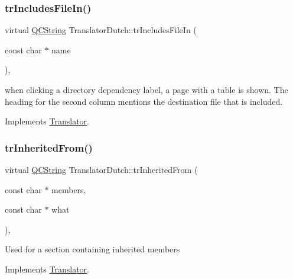 \mbox{\label{class_translator_dutch_acc4990897794e3f5a18bb1e1731b472a}} 
\subsubsection{\texorpdfstring{trIncludesFileIn()}{trIncludesFileIn()}}
{\footnotesize\ttfamily virtual \mbox{\hyperlink{class_q_c_string}{Q\+C\+String}} Translator\+Dutch\+::tr\+Includes\+File\+In (\begin{DoxyParamCaption}\item[{const char $\ast$}]{name }\end{DoxyParamCaption})\hspace{0.3cm}{\ttfamily [inline]}, {\ttfamily [virtual]}}

when clicking a directory dependency label, a page with a table is shown. The heading for the second column mentions the destination file that is included. 

Implements \mbox{\hyperlink{class_translator}{Translator}}.

\mbox{\label{class_translator_dutch_aec0b11002e013150545da621cea9f585}} 
\subsubsection{\texorpdfstring{trInheritedFrom()}{trInheritedFrom()}}
{\footnotesize\ttfamily virtual \mbox{\hyperlink{class_q_c_string}{Q\+C\+String}} Translator\+Dutch\+::tr\+Inherited\+From (\begin{DoxyParamCaption}\item[{const char $\ast$}]{members,  }\item[{const char $\ast$}]{what }\end{DoxyParamCaption})\hspace{0.3cm}{\ttfamily [inline]}, {\ttfamily [virtual]}}

Used for a section containing inherited members 

Implements \mbox{\hyperlink{class_translator}{Translator}}.

\mbox{\label{class_translator_dutch_a91a93095e1b1e7beaee449d44095094a}} 
